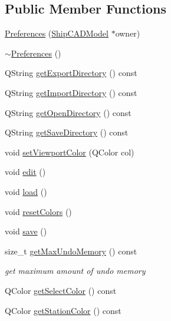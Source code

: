 \subsection*{Public Member Functions}
\begin{DoxyCompactItemize}
\item 
\hyperlink{classShipCAD_1_1Preferences_afd469134e34b7e1982efeb1e402fce3b}{Preferences} (\hyperlink{classShipCAD_1_1ShipCADModel}{Ship\-C\-A\-D\-Model} $\ast$owner)
\item 
\hyperlink{classShipCAD_1_1Preferences_ab38e15f8965b1cd69b80369bb16a0995}{$\sim$\-Preferences} ()
\item 
Q\-String \hyperlink{classShipCAD_1_1Preferences_a9673a7bf93112ff78b6c8ca5d7cc3a4b}{get\-Export\-Directory} () const 
\item 
Q\-String \hyperlink{classShipCAD_1_1Preferences_a275aac8dc6e72c021ad00ff68f2fba54}{get\-Import\-Directory} () const 
\item 
Q\-String \hyperlink{classShipCAD_1_1Preferences_ab1ac99acb5ceb37b5cf7f6b21f376f27}{get\-Open\-Directory} () const 
\item 
Q\-String \hyperlink{classShipCAD_1_1Preferences_a5ee1cbf3c572b9253cfe958055e0eb43}{get\-Save\-Directory} () const 
\item 
void \hyperlink{classShipCAD_1_1Preferences_ad120b46e68a08d7682aaeb351b4c179d}{set\-Viewport\-Color} (Q\-Color col)
\item 
void \hyperlink{classShipCAD_1_1Preferences_a326180a1551596a3a9f2709d31c9fb10}{edit} ()
\item 
void \hyperlink{classShipCAD_1_1Preferences_a70c1b8f3b9e117d67c3cd50c33f66f3a}{load} ()
\item 
void \hyperlink{classShipCAD_1_1Preferences_a2e7e496b3417148240994e51281b0858}{reset\-Colors} ()
\item 
void \hyperlink{classShipCAD_1_1Preferences_ab3f40207c39fe262a7ae16ca22b297b2}{save} ()
\item 
size\-\_\-t \hyperlink{classShipCAD_1_1Preferences_a8ddfbabd8be21f6390f3750600047a87}{get\-Max\-Undo\-Memory} () const 
\begin{DoxyCompactList}\small\item\em get maximum amount of undo memory \end{DoxyCompactList}\item 
Q\-Color \hyperlink{classShipCAD_1_1Preferences_af54f177e516849e7f8212841db9b1ed8}{get\-Select\-Color} () const 
\item 
Q\-Color \hyperlink{classShipCAD_1_1Preferences_a39e4abd32055512f8009f4c8ab5cd379}{get\-Station\-Color} () const 

\end{DoxyCompactItemize}
